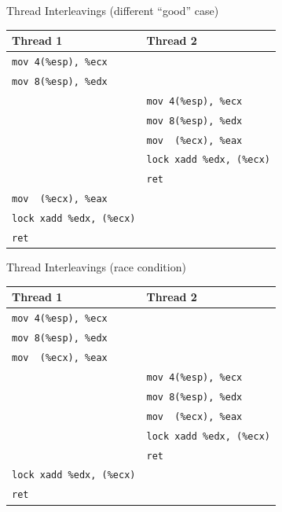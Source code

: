 \documentclass[xcolor=dvipsnames]{beamer}
\begin{document}
\begin{frame}{Thread Interleavings (different ``good'' case)}
	\begin{center}
		\begin{tabular}{|l|l|}
			\hline
			\cellcolor{thread1} {\bf Thread 1} & \cellcolor{thread2} {\bf Thread 2} \\
			\hline
			\texttt{mov 4(\%esp), \%ecx} & \\
			\texttt{mov 8(\%esp), \%edx} & \\
			& \texttt{mov 4(\%esp), \%ecx} \\
			& \texttt{mov 8(\%esp), \%edx} \\
			& \texttt{mov~~(\%ecx), \%eax} \\
			& \texttt{lock xadd \%edx, (\%ecx)} \\
			& \texttt{ret} \\
			\texttt{mov~~(\%ecx), \%eax} & \\
			\texttt{lock xadd \%edx, (\%ecx)} & \\
			\texttt{ret} & \\
			\hline
		\end{tabular}
	\end{center}
\end{frame}
\begin{frame}{Thread Interleavings (race condition)}
	\begin{center}
		\begin{tabular}{|l|l|}
			\hline
			\cellcolor{thread1} {\bf Thread 1} & \cellcolor{thread2} {\bf Thread 2} \\
			\hline
			\texttt{mov 4(\%esp), \%ecx} & \\
			\texttt{mov 8(\%esp), \%edx} & \\
			\texttt{mov~~(\%ecx), \%eax} & \\
			& \texttt{mov 4(\%esp), \%ecx} \\
			& \texttt{mov 8(\%esp), \%edx} \\
			& \texttt{mov~~(\%ecx), \%eax} \\
			& \texttt{lock xadd \%edx, (\%ecx)} \\
			& \texttt{ret} \\
			\texttt{lock xadd \%edx, (\%ecx)} & \\
			\texttt{ret} & \\
			\hline
		\end{tabular}
	\end{center}
\end{frame}

\end{document}
